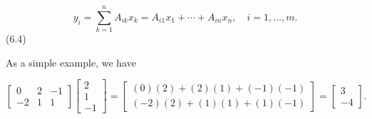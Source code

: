 \[y_{i}=\sum_{k=1}^{n}A_{ik}x_{k}=A_{i1}x_{1}+\cdots+A_{in}x_{n},\quad i=1,\ldots ,m.\] (6.4)

As a simple example, we have

\[\left[\begin{array}{rr}0&2&-1\\ -2&1&1\end{array}\right]\left[\begin{array}{r}2\\ 1\\ -1\end{array}\right]=\left[\begin{array}{c}(0)(2)+(2)(1)+(-1)(-1)\\ (-2)(2)+(1)(1)+(1)(-1)\end{array}\right]=\left[\begin{array}{r}3\\ -4\end{array}\right].\] 
